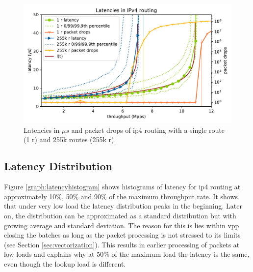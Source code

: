\begin{figure}[!ht]
\noindent\hspace{0.5mm}\includegraphics[width=\linewidth]{pics/latencies_per_throughput_summary_ip4.pdf}
\caption{Latencies in $\mu s$ and packet drops of \Ac{ip4} routing with a single route (1 r) and 255k routes (255k r). }
\label{graph:latencyoverview}
\end{figure}

\subsection{Latency Distribution}

Figure \ref{graph:latencyhistogram} shows histograms of latency for
\Ac{ip4} routing at approximately 10\%, 50\% and 90\% of the maximum
throughput rate. It shows that under very low load the latency
distribution peaks in the beginning. Later on, the distribution can be
approximated as a standard distribution but with growing average and
standard deviation. The reason for this is lies within \Ac{vpp}
closing the batches as long as the packet processing is not stressed
to its limits (see Section \ref{sec:vectorization}). This results in earlier
processing of packets at low loads and explains why at 50\% of the
maximum load the latency is the same, even though the lookup load is
different. \cite{linguaglossa2017high}





